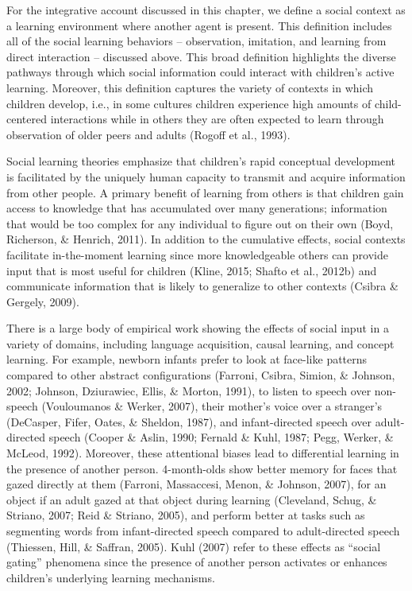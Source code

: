 \documentclass[oneside]{report}
\begin{document}
For the integrative account discussed in this chapter, we define a
social context as a learning environment where another agent is present.
This definition includes all of the social learning behaviors --
observation, imitation, and learning from direct interaction --
discussed above. This broad definition highlights the diverse pathways
through which social information could interact with children's active
learning. Moreover, this definition captures the variety of contexts in
which children develop, i.e., in some cultures children experience high
amounts of child-centered interactions while in others they are often
expected to learn through observation of older peers and adults (Rogoff
et al., 1993).

Social learning theories emphasize that children's rapid conceptual
development is facilitated by the uniquely human capacity to transmit
and acquire information from other people. A primary benefit of learning
from others is that children gain access to knowledge that has
accumulated over many generations; information that would be too complex
for any individual to figure out on their own (Boyd, Richerson, \&
Henrich, 2011). In addition to the cumulative effects, social contexts
facilitate in-the-moment learning since more knowledgeable others can
provide input that is most useful for children (Kline, 2015; Shafto et
al., 2012b) and communicate information that is likely to generalize to
other contexts (Csibra \& Gergely, 2009).

There is a large body of empirical work showing the effects of social
input in a variety of domains, including language acquisition, causal
learning, and concept learning. For example, newborn infants prefer to
look at face-like patterns compared to other abstract configurations
(Farroni, Csibra, Simion, \& Johnson, 2002; Johnson, Dziurawiec, Ellis,
\& Morton, 1991), to listen to speech over non-speech (Vouloumanos \&
Werker, 2007), their mother's voice over a stranger's (DeCasper, Fifer,
Oates, \& Sheldon, 1987), and infant-directed speech over adult-directed
speech (Cooper \& Aslin, 1990; Fernald \& Kuhl, 1987; Pegg, Werker, \&
McLeod, 1992). Moreover, these attentional biases lead to differential
learning in the presence of another person. 4-month-olds show better
memory for faces that gazed directly at them (Farroni, Massaccesi,
Menon, \& Johnson, 2007), for an object if an adult gazed at that object
during learning (Cleveland, Schug, \& Striano, 2007; Reid \& Striano,
2005), and perform better at tasks such as segmenting words from
infant-directed speech compared to adult-directed speech (Thiessen,
Hill, \& Saffran, 2005). Kuhl (2007) refer to these effects as ``social
gating'' phenomena since the presence of another person activates or
enhances children's underlying learning mechanisms.
\end{document}
